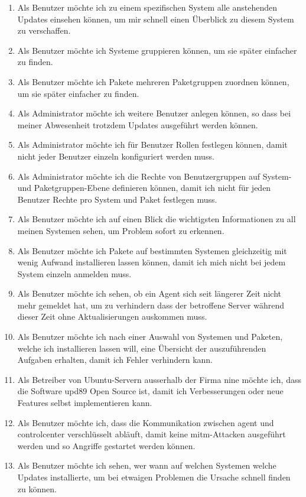 \begin{enumerate}
    \item Als Benutzer möchte ich zu einem spezifischen System alle anstehenden Updates einsehen können, um mir schnell einen Überblick zu diesem System zu verschaffen.
    \item Als Benutzer möchte ich Systeme gruppieren können, um sie später einfacher zu finden.
    \item Als Benutzer möchte ich Pakete mehreren Paketgruppen zuordnen können, um sie später einfacher zu finden.
    \item Als Administrator möchte ich weitere Benutzer anlegen können, so dass bei meiner Abwesenheit trotzdem Updates ausgeführt werden können.
    \item Als Administrator möchte ich für Benutzer Rollen festlegen können, damit nicht jeder Benutzer einzeln konfiguriert werden muss.
    \item Als Administrator möchte ich die Rechte von Benutzergruppen auf System- und Paketgruppen-Ebene definieren können, damit ich nicht für jeden Benutzer Rechte pro System und Paket festlegen muss.
    \item Als Benutzer möchte ich auf einen Blick die wichtigsten Informationen zu all meinen Systemen sehen, um Problem sofort zu erkennen.
    \item Als Benutzer möchte ich Pakete auf bestimmten Systemen gleichzeitig mit wenig Aufwand installieren lassen können, damit ich mich nicht bei jedem System einzeln anmelden muss.
    \item Als Benutzer möchte ich sehen, ob ein Agent sich seit längerer Zeit nicht mehr gemeldet hat, um zu verhindern dass der betroffene Server während dieser Zeit ohne Aktualisierungen auskommen muss.
    \item Als Benutzer möchte ich nach einer Auswahl von Systemen und Paketen, welche ich installieren lassen will, eine Übersicht der auszuführenden Aufgaben erhalten, damit ich Fehler verhindern kann.
    \item Als Betreiber von Ubuntu-Servern ausserhalb der Firma \gls{nine} möchte ich, dass die Software \gls{upd89} Open Source ist, damit ich Verbesserungen oder neue Features selbst implementieren kann.
    \item Als Benutzer möchte ich, dass die Kommunikation zwischen \gls{agent} und \gls{controlcenter} verschlüsselt abläuft, damit keine \gls{mitm}-Attacken ausgeführt werden und so Angriffe gestartet werden können.
    \item Als Benutzer möchte ich sehen, wer wann auf welchen Systemen welche Updates installierte, um bei etwaigen Problemen die Ursache schnell finden zu können.

\end{enumerate}
